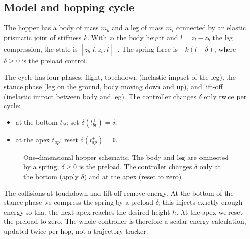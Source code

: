 \documentclass[11pt]{article}
\begin{document}
\subsection{Model and hopping cycle}

The hopper has a body of mass $m_b$ and a leg of mass $m_l$ connected by an
elastic prismatic joint of stiffness $k$.  With $z_b$ the body height and
$l=z_l-z_b$ the leg compression, the state is
$[z_b,l,\dot z_b,\dot l]^\top$.  The spring force is $-k(l+\delta)$, where
$\delta\ge0$ is the preload control.

The cycle has four phases: flight, touchdown (inelastic impact of the leg), the
stance phase (leg on the ground, body moving down and up), and lift-off
(inelastic impact between body and leg).  The controller changes $\delta$ only
twice per cycle:
\begin{itemize}[leftmargin=1.4em]
  \item at the bottom $t_{bt}$: set $\delta(t_{bt}^+)=\bar\delta$;
  \item at the apex $t_{ap}$: reset $\delta(t_{ap}^+)=0$.
\end{itemize}

\begin{figure}[htbp]
\centering
{}
\caption{One-dimensional hopper schematic.  The body and leg are connected
by a spring; $\delta\ge0$ is the preload.  The controller changes $\delta$
only at the bottom (apply $\bar\delta$) and at the apex (reset to zero).}
\label{fig:hopper}
\end{figure}

\begin{intuition}[breakable=false,title={The controller in one sentence}]
The collisions at touchdown and lift-off remove energy.  At the bottom of the
stance phase we compress the spring by a preload $\bar\delta$; this injects
exactly enough energy so that the next apex reaches the desired height $h$.
At the apex we reset the preload to zero.  The whole controller is therefore
a scalar energy calculation, updated twice per hop, not a trajectory tracker.
\end{intuition}
\end{document}
